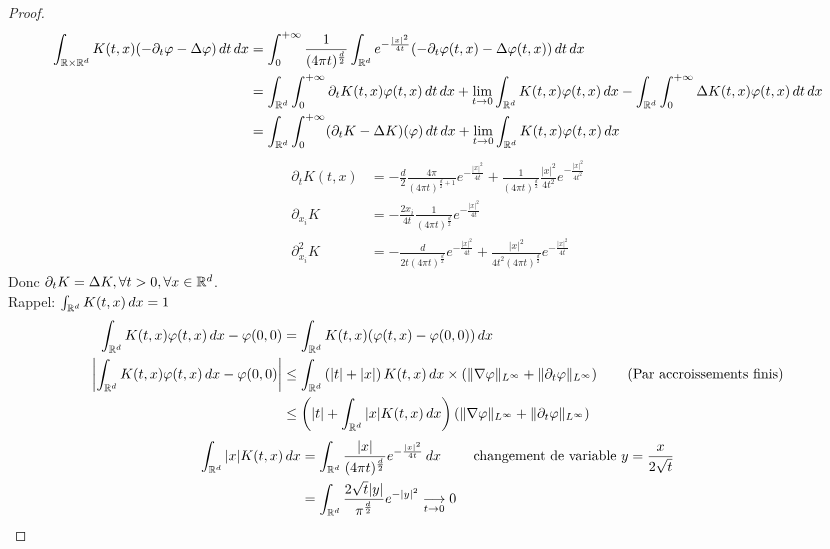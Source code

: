 \documentclass[]{report}
\begin{document}
    \begin{proof}
        \begin{align*}
            \int_{\mathbb{R}\times \mathbb{R}^d}K(t,x)(-\partial_t\varphi-\Delta\varphi)\, dt\, dx&=\int_{0}^{+\infty}\frac{1}{(4\pi t)^{\frac{d}{2}}}\int_{\mathbb{R}^d}e^{-\frac{|x|^2}{4t}}(-\partial_t\varphi(t,x)-\Delta\varphi(t,x))\, dt\, dx\\
            &=\int_{\mathbb{R}^d}\int_{0}^{+\infty}\partial_t K(t,x)\varphi(t,x)\, dt\, dx+\lim_{t\to 0}\int_{\mathbb{R}^d}K(t,x)\varphi(t,x)\, dx-\int_{\mathbb{R}^d}\int_{0}^{+\infty}\Delta K(t,x)\varphi(t,x)\, dt\, dx\\
            &=\int_{\mathbb{R}^d}\int_{0}^{+\infty}(\partial_t K-\Delta K)(\varphi)\, dt\, dx+\lim_{t\to 0}\int_{\mathbb{R}^d}K(t,x)\varphi(t,x)\, dx
        \end{align*}
        \begin{align*}
            \partial_t K(t,x)&=-\frac{d}{2}\frac{4\pi}{(4\pi t)^{\frac{d}{2}+1}}e^{-\frac{|x|^2}{4t}}+\frac{1}{(4\pi t)^{\frac{d}{2}}}\frac{|x|^2}{4t^2}e^{-\frac{|x|^2}{4t^2}}\\
            \partial_{x_i} K&=-\frac{2 x_i}{4 t}\frac{1}{(4\pi t)^{\frac{d}{2}}}e^{-\frac{|x|^2}{4t}}\\
            \partial_{x_i}^2K&=-\frac{d}{2t(4\pi t)^{\frac{d}{2}}}e^{-\frac{|x|^2}{4t}}+\frac{|x|^2}{4t^2(4\pi t)^{\frac{d}{2}}}e^{-\frac{|x|^2}{4t}}
        \end{align*}
        Donc $\partial_t K=\Delta K,\forall t>0,\forall x\in \mathbb{R}^d$.\\
        Rappel: $\int_{\mathbb{R}^d}K(t,x)\, dx=1$
        \begin{align*}
            \int_{\mathbb{R}^d}K(t,x)\varphi(t,x)\, dx-\varphi(0,0)&=\int_{\mathbb{R}^d}K(t,x)(\varphi(t,x)-\varphi(0,0))\, dx\\
            \left|\int_{\mathbb{R}^d}K(t,x)\varphi(t,x)\, dx-\varphi(0,0)\right|&\le \int_{\mathbb{R}^d}\left(|t|+|x|\right)K(t,x)\, dx\times \left(\lVert \nabla\varphi \rVert_{L^\infty}+\lVert \partial_t \varphi \rVert_{L^\infty}\right)\qquad \text{(Par accroissements finis)}\\
            &\le \left(|t|+\int_{\mathbb{R}^d}|x| K(t,x)\, dx\right)\left(\lVert \nabla\varphi \rVert_{L^\infty}+\lVert \partial_t \varphi \rVert_{L^\infty}\right)
        \end{align*}
        \begin{align*}
            \int_{\mathbb{R}^d}|x|K(t,x)\, dx&=\int_{\mathbb{R}^d}\frac{|x|}{(4\pi t)^{\frac{d}{2}}}e^{-\frac{|x|^2}{4t}}\, dx \qquad \text{ changement de variable $y=\frac{x}{2\sqrt{t}}$}\\
            &=\int_{\mathbb{R}^d}\frac{2\sqrt{t}|y|}{\pi^{\frac{d}{2}}}e^{-|y|^2}\underset{t\to 0}{\longrightarrow} 0
        \end{align*}
    \end{proof}
\end{document}
